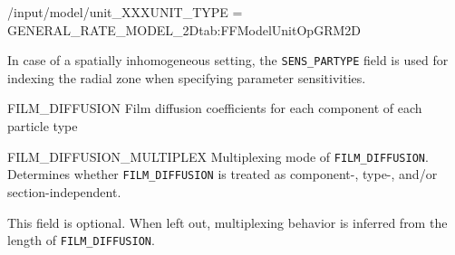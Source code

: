 \begin{condsubgroup}{/input/model/unit\_XXX}{UNIT\_TYPE = GENERAL\_RATE\_MODEL\_2D}{tab:FFModelUnitOpGRM2D}
\begin{dataset}[unit=--,type=double,range={$(0,1]
    In case of a spatially inhomogeneous setting, the \texttt{SENS\_PARTYPE} field is used for indexing the radial zone when specifying parameter sensitivities.
  \end{dataset}
  \begin{dataset}[unit=\si{\metre\per\second},type=double,range={$\geq 0$},length={see \texttt{FILM\_DIFFUSION\_MULTIPLEX}}]{FILM\_DIFFUSION}
    Film diffusion coefficients for each component of each particle type
  \end{dataset}
  \begin{dataset}[unit=--,type=int,range={$\{0, \dots, 3 \}$},length={1}]{FILM\_DIFFUSION\_MULTIPLEX}
    Multiplexing mode of \texttt{FILM\_DIFFUSION}.
    Determines whether \texttt{FILM\_DIFFUSION} is treated as component-, type-, and/or section-independent.

    This field is optional.
    When left out, multiplexing behavior is inferred from the length of \texttt{FILM\_DIFFUSION}.


\end{dataset}
\end{condsubgroup}
